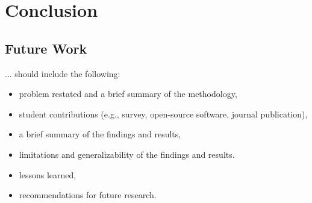 \chapter{Conclusion\label{cha:chapter6}}

\section{Future Work}

... should include the following:
\begin{itemize}

\item problem restated and a brief summary of the methodology,
\item student contributions (e.g., survey, open-source software, journal publication),
\item a brief summary of the findings and results,
\item limitations and generalizability of the findings and results.
\item lessons learned,
\item recommendations for future research.

\end{itemize}

